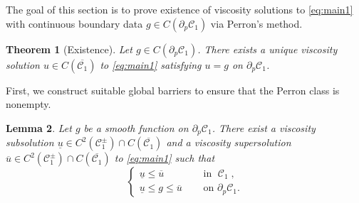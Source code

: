\documentclass[12pt]{article}
\newtheorem{Theorem}{Theorem}
\numberwithin{Theorem}{section}
\newtheorem{Lemma}[Theorem]{Lemma}
\theoremstyle{definition}
\theoremstyle{remark}
\numberwithin{equation}{section}
\DeclareMathOperator{\C}{\mathcal{C}}
\begin{document}
The goal of this section is to prove existence of viscosity solutions to \eqref{eq:main1} with continuous boundary data $g \in C(\partial_p \mathcal{C}_1)$ via Perron's method.

\begin{Theorem}[Existence]
\label{thm:existence}
Let $g \in C(\partial_p \mathcal{C}_1)$. There exists a unique viscosity solution $u \in C(\overline{\mathcal{C}_1})$ to \eqref{eq:main1} satisfying $u = g$ on $\partial_p \mathcal{C}_1$.
\end{Theorem}

First, we construct suitable global barriers to ensure that the Perron class is nonempty.

\begin{Lemma}
\label{lem:barriers_existence}
Let $g$ be a smooth function on $\partial_p \mathcal{C}_1$. There exist a viscosity subsolution $\underline{u} \in C^2(\mathcal{C}_1^\pm) \cap C(\overline{\mathcal{C}_1}) $ and a viscosity supersolution $\overline{u} \in C^2(\mathcal{C}_1^\pm) \cap C(\overline{\mathcal{C}_1})$ to \eqref{eq:main1} such that 
\begin{equation}
    \begin{cases}
        \underline{u} \leq \overline{u} \quad &\text{ in } \C_1, \\ 
        \underline{u} \le g \le \overline{u} \quad &\text{ on } \partial_p \mathcal{C}_1.
    \end{cases}
\end{equation}



\end{Lemma}
\end{document}
